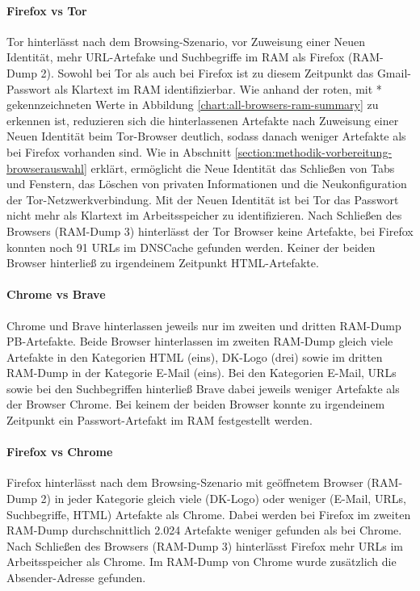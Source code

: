 \paragraph*{Firefox vs Tor}
Tor hinterlässt nach dem Browsing-Szenario, vor Zuweisung einer \glqq{}Neuen Identität\grqq{}, mehr URL-Artefake und Suchbegriffe im RAM als Firefox (RAM-Dump 2). 
Sowohl bei Tor als auch bei Firefox ist zu diesem Zeitpunkt das Gmail-Passwort als Klartext im RAM identifizierbar.
Wie anhand der roten, mit * gekennzeichneten Werte in Abbildung \ref{chart:all-browsers-ram-summary} zu erkennen ist, 
reduzieren sich die hinterlassenen Artefakte nach Zuweisung einer \glqq{}Neuen Identität\grqq{} beim Tor-Browser deutlich, sodass danach weniger Artefakte als bei Firefox vorhanden sind.
Wie in Abschnitt \ref{section:methodik-vorbereitung-browserauswahl} erklärt, ermöglicht die \glqq{}Neue Identität\grqq{} das Schließen von Tabs und Fenstern, das Löschen von privaten Informationen und die Neukonfiguration der Tor-Netzwerkverbindung.
Mit der \glqq{}Neuen Identität\grqq{} ist bei Tor das Passwort nicht mehr als Klartext im Arbeitsspeicher zu identifizieren.
Nach Schließen des Browsers (RAM-Dump 3) hinterlässt der Tor Browser keine Artefakte, bei Firefox konnten noch 91 URLs im DNSCache gefunden werden. 
Keiner der beiden Browser hinterließ zu irgendeinem Zeitpunkt HTML-Artefakte.

\paragraph*{Chrome vs Brave}
Chrome und Brave hinterlassen jeweils nur im zweiten und dritten RAM-Dump PB-Artefakte. Beide Browser hinterlassen im zweiten RAM-Dump gleich viele Artefakte in den Kategorien HTML (eins), DK-Logo (drei) sowie im dritten RAM-Dump in der Kategorie E-Mail (eins). Bei den Kategorien E-Mail, URLs sowie bei den Suchbegriffen hinterließ Brave dabei jeweils weniger Artefakte als der Browser Chrome. Bei keinem der beiden Browser konnte zu irgendeinem Zeitpunkt ein Passwort-Artefakt im RAM festgestellt werden.

\paragraph*{Firefox vs Chrome}
Firefox hinterlässt nach dem Browsing-Szenario mit geöffnetem Browser (RAM-Dump 2) in jeder Kategorie gleich viele (DK-Logo) oder weniger (E-Mail, URLs, Suchbegriffe, HTML) Artefakte als Chrome.
Dabei werden bei Firefox im zweiten RAM-Dump durchschnittlich 2.024 Artefakte weniger gefunden als bei Chrome.
Nach Schließen des Browsers (RAM-Dump 3) hinterlässt Firefox mehr URLs im Arbeitsspeicher als Chrome. Im RAM-Dump von Chrome wurde zusätzlich die Absender-Adresse gefunden.

